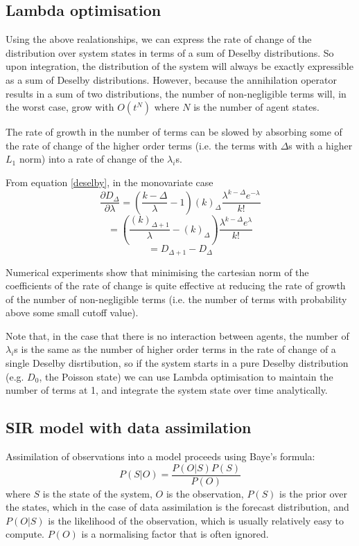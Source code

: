 \documentclass[letterpaper,twocolumn,10pt]{article}
\begin{document}
\subsection{Lambda optimisation}

Using the above realationships, we can express the rate of change of the distribution over system states in terms of a sum of Deselby distributions. So upon integration, the distribution of the system will always be exactly expressible as a sum of Deselby distributions. However, because the annihilation operator results in a sum of two distributions, the number of non-negligible terms will, in the worst case, grow with $O(t^N)$ where $N$ is the number of agent states.

The rate of growth in the number of terms can be slowed by absorbing some of the rate of change of the higher order terms (i.e. the terms with $\Delta$s with a higher $L_1$ norm) into a rate of change of the $\lambda_i$s.

From equation \ref{deselby}, in the monovariate case
\[
\frac{\partial D_\Delta}{\partial \lambda} = \left(\frac{k-\Delta}{\lambda} - 1\right) (k)_{\Delta} \frac{\lambda^{k-\Delta} e^{-\lambda}}{k!}
\]
\[
= \left(\frac{(k)_{\Delta+1}}{\lambda} - (k)_{\Delta}\right)  \frac{\lambda^{k-\Delta} e^{\lambda}}{k!}
\]
\[
= D_{\Delta+1} - D_\Delta
\]

Numerical experiments show that minimising the cartesian norm of the coefficients of the rate of change is quite effective at reducing the rate of growth of the number of non-negligible terms (i.e. the number of terms with probability above some small cutoff value).

Note that, in the case that there is no interaction between agents, the number of $\lambda_i$s is the same as the number of higher order terms in the rate of change of a single Deselby disrtibution, so if the system starts in a pure Deselby distribution (e.g. $D_0$, the Poisson state) we can use Lambda optimisation to maintain the number of terms at 1, and integrate the system state over time analytically.

\subsection{SIR model with data assimilation}

Assimilation of observations into a model proceeds using Baye's formula:
\[
P(S|O) = \frac{P(O|S) P(S)}{P(O)}
\]
where $S$ is the state of the system, $O$ is the observation, $P(S)$ is the prior over the states, which in the case of data assimilation is the forecast distribution, and $P(O|S)$ is the likelihood of the observation, which is usually relatively easy to compute. $P(O)$ is a normalising factor that is often ignored.
\end{document}
